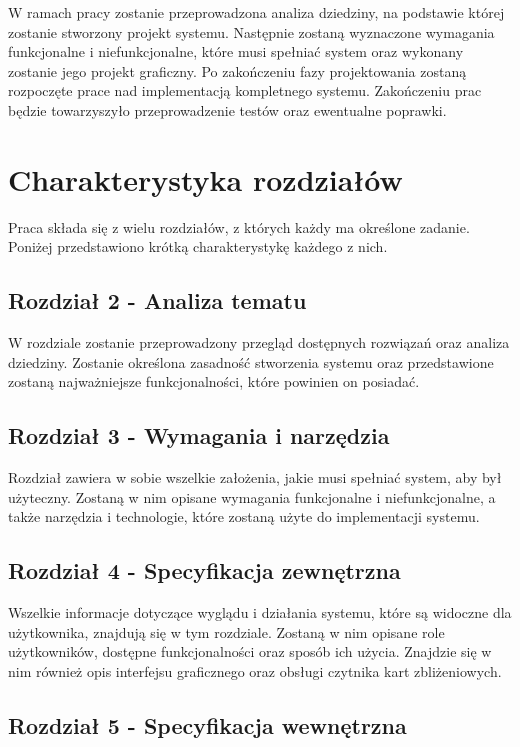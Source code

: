 W ramach pracy zostanie przeprowadzona analiza dziedziny, na podstawie której zostanie stworzony projekt systemu. Następnie zostaną wyznaczone wymagania funkcjonalne i niefunkcjonalne, które musi spełniać system oraz wykonany zostanie jego projekt graficzny. Po zakończeniu fazy projektowania zostaną rozpoczęte prace nad implementacją kompletnego systemu. Zakończeniu prac będzie towarzyszyło przeprowadzenie testów oraz ewentualne poprawki.

\section{Charakterystyka rozdziałów}

Praca składa się z wielu rozdziałów, z których każdy ma określone zadanie. Poniżej przedstawiono krótką charakterystykę każdego z nich.

\subsection*{Rozdział 2 - Analiza tematu}

W rozdziale zostanie przeprowadzony przegląd dostępnych rozwiązań oraz analiza dziedziny. Zostanie określona zasadność stworzenia systemu oraz przedstawione zostaną najważniejsze funkcjonalności, które powinien on posiadać.

\subsection*{Rozdział 3 - Wymagania i narzędzia}

Rozdział zawiera w sobie wszelkie założenia, jakie musi spełniać system, aby był użyteczny. Zostaną w nim opisane wymagania funkcjonalne i niefunkcjonalne, a także narzędzia i technologie, które zostaną użyte do implementacji systemu.

\subsection*{Rozdział 4 - Specyfikacja zewnętrzna}

Wszelkie informacje dotyczące wyglądu i działania systemu, które są widoczne dla użytkownika, znajdują się w tym rozdziale. Zostaną w nim opisane role użytkowników, dostępne funkcjonalności oraz sposób ich użycia. Znajdzie się w nim również opis interfejsu graficznego oraz obsługi czytnika kart zbliżeniowych.

\subsection*{Rozdział 5 - Specyfikacja wewnętrzna}

